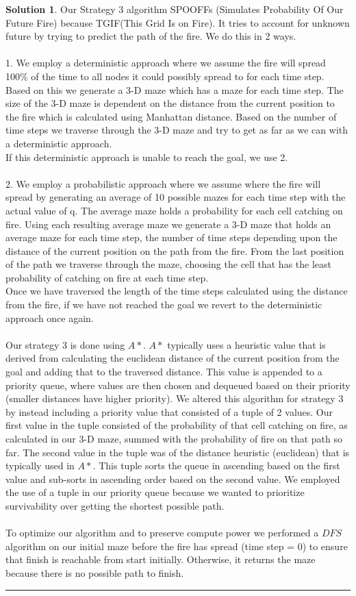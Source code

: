 \documentclass{article}
\theoremstyle{definition}
\def\fline{\rule{0.75\linewidth}{0.5pt}}
\newcommand{\finishline}{\vspace{-15pt}\begin{center}\fline\end{center}}
\newtheorem*{solution*}{Solution}
\newenvironment{solution}{\begin{solution*}}{{\finishline} \end{solution*}}
\begin{document}
\begin{solution}
	Our Strategy 3 algorithm SPOOFFs (Simulates Probability Of Our Future Fire) because TGIF(This Grid Is on Fire). It tries to account for unknown future by trying to predict the path of the fire. We do this in 2 ways. 
    \\\\
	1. We employ a deterministic approach where we assume the fire will spread 100\% of the time to all nodes it could possibly spread to for each time step. Based on this we generate a 3-D maze which has a maze for each time step. The size of the 3-D maze is dependent on the distance from the current position to the fire which is calculated using Manhattan distance. Based on the number of time steps we traverse through the 3-D maze and try to get as far as we can with a deterministic approach. 
	\\
	If this deterministic approach is unable to reach the goal, we use 2. 
	\\\\
	2. We employ a probabilistic approach where we assume where the fire will spread by generating an average of 10 possible mazes for each time step with the actual value of q. The average maze holds a probability for each cell catching on fire. Using each resulting average maze we generate a 3-D maze that holds an average maze for each time step, the number of time steps depending upon the distance of the current position on the path from the fire. From the last position of the path we traverse through the maze, choosing the cell that has the least probability of catching on fire at each time step.
	\\ 
	Once we have traversed the length of the time steps calculated using the distance from the fire, if we have not reached the goal we revert to the deterministic approach once again.
	\\\\
	Our strategy 3 is done using $A*$. $A*$ typically uses a heuristic value that is derived from calculating the euclidean distance of the current position from the goal and adding that to the traversed distance. This value is appended to a priority queue, where values are then chosen and dequeued based on their priority (smaller distances have higher priority). We altered this algorithm for strategy 3 by instead including a priority value that consisted of a tuple of 2 values. Our first value in the tuple consisted of the probability of that cell catching on fire, as calculated in our 3-D maze, summed with the probability of fire on that path so far. The second value in the tuple was of the distance heuristic (euclidean) that is typically used in $A*$. This tuple sorts the queue in ascending based on the first value and sub-sorts in ascending order based on the second value. We employed the use of a tuple in our priority queue because we wanted to prioritize survivability over getting the shortest possible path. 
	\\\\
	To optimize our algorithm and to preserve compute power we performed a $DFS$ algorithm on our initial maze before the fire has spread (time step = 0) to ensure that finish is reachable from start initially. Otherwise, it returns the maze because there is no possible path to finish.
	

\end{solution}
\end{document}
